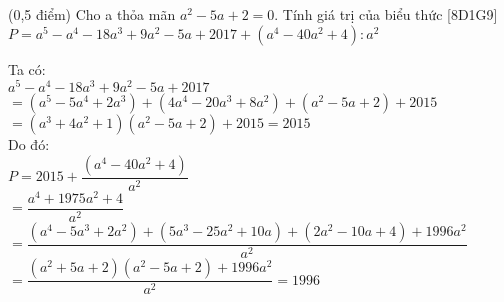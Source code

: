 \documentclass[12pt,a4paper,oneside]{book}
\begin{document}
\begin{ex} 
   (0,5 điểm) Cho a thỏa mãn ${{a}^{2}}-5a+2=0$. Tính giá trị của biểu thức [8D1G9]\\
   $P={{a}^{5}}-{{a}^{4}}-18{{a}^{3}}+9{{a}^{2}}-5a+2017+\left( {{a}^{4}}-40{{a}^{2}}+4 \right):{{a}^{2}}$
      \loigiai
    {
    	Ta có: \\
        ${{a}^{5}}-{{a}^{4}}-18{{a}^{3}}+9{{a}^{2}}-5a+2017$\\
    	$=\left( {{a}^{5}}-5{{a}^{4}}+2{{a}^{3}} \right)+\left( 4{{a}^{4}}-20{{a}^{3}}+8{{a}^{2}} \right)+\left( {{a}^{2}}-5a+2 \right)+2015$\\
    	$=\left( {{a}^{3}}+4{{a}^{2}}+1 \right)\left( {{a}^{2}}-5a+2 \right)+2015=2015$\\
    	Do đó: \\
    	$P=2015+\dfrac{\left( {{a}^{4}}-40{{a}^{2}}+4 \right)}{{{a}^{2}}}$ \\
    	$=\dfrac{{{a}^{4}}+1975{{a}^{2}}+4}{{{a}^{2}}}$\\
    	$=\dfrac{\left( {{a}^{4}}-5{{a}^{3}}+2{{a}^{2}} \right)+\left( 5{{a}^{3}}-25{{a}^{2}}+10a \right)+\left( 2{{a}^{2}}-10a+4 \right)+1996{{a}^{2}}}{{{a}^{2}}}$\\
       	$=\dfrac{\left( {{a}^{2}}+5a+2 \right)\left( {{a}^{2}}-5a+2 \right)+1996{{a}^{2}}}{{{a}^{2}}}=1996$
    	
    	
    }
\end{ex}


\end{document}

